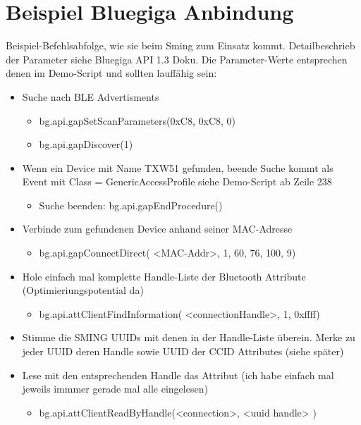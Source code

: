 \chapter{Beispiel Bluegiga Anbindung}
Beispiel-Befehlsabfolge, wie sie beim Sming zum Einsatz kommt. Detailbeschrieb der Parameter siehe Bluegiga API 1.3 Doku. Die Parameter-Werte entsprechen denen im Demo-Script und sollten lauffähig sein:
	
\begin{itemize}
	\itemsep 1pt \parskip 0pt \parsep 0pt
	\item Suche nach BLE Advertisments
	\begin{itemize}
		\itemsep 1pt \parskip 0pt \parsep 0pt
		\item bg.api.gapSetScanParameters(0xC8, 0xC8, 0)
		\item bg.api.gapDiscover(1)
	\end{itemize}
	
	\item Wenn ein Device mit Name TXW51 gefunden, beende Suche kommt als Event mit Class = GenericAccessProfile siehe Demo-Script ab Zeile 238
	\begin{itemize}
		\itemsep 1pt \parskip 0pt \parsep 0pt
		\item Suche beenden: bg.api.gapEndProcedure()
	\end{itemize}
	
	
	\item Verbinde zum gefundenen Device anhand seiner MAC-Adresse
	\begin{itemize}
		\itemsep 1pt \parskip 0pt \parsep 0pt
		\item bg.api.gapConnectDirect( <MAC-Addr>, 1, 60, 76, 100, 9)
	\end{itemize}
	
	
	
	\item Hole einfach mal komplette Handle-Liste der Bluetooth Attribute (Optimieriungspotential da)
	\begin{itemize}
		\itemsep 1pt \parskip 0pt \parsep 0pt
		\item bg.api.attClientFindInformation( <connectionHandle>, 1, 0xffff)
	\end{itemize}
	
	
	\item Stimme die SMING UUIDs mit denen in der Handle-Liste überein. Merke zu jeder UUID deren Handle sowie UUID der CCID Attributes (siehe später)
	
	
	\item Lese mit den entsprechenden Handle das Attribut (ich habe einfach mal jeweils immmer gerade mal alle eingelesen)
	\begin{itemize}
		\itemsep 1pt \parskip 0pt \parsep 0pt
		\item bg.api.attClientReadByHandle(<connection>, <uuid handle> )
	\end{itemize}
	

\end{itemize}
